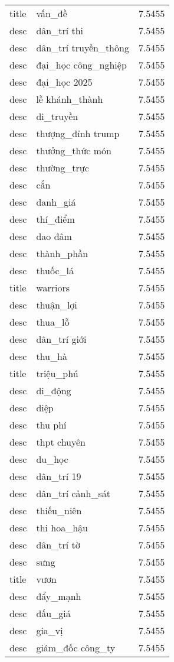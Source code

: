 \documentclass{article}
\begin{document}
\begin{tabular}{lll}
title & vấn\_đề & 7.5455\\
desc & dân\_trí thi & 7.5455\\
desc & dân\_trí truyền\_thông & 7.5455\\
desc & đại\_học công\_nghiệp & 7.5455\\
desc & đại\_học 2025 & 7.5455\\
desc & lễ khánh\_thành & 7.5455\\
desc & di\_truyền & 7.5455\\
desc & thượng\_đỉnh trump & 7.5455\\
desc & thưởng\_thức món & 7.5455\\
desc & thường\_trực & 7.5455\\
desc & cắn & 7.5455\\
desc & danh\_giá & 7.5455\\
desc & thí\_điểm & 7.5455\\
desc & dao đâm & 7.5455\\
desc & thành\_phần & 7.5455\\
desc & thuốc\_lá & 7.5455\\
title & warriors & 7.5455\\
desc & thuận\_lợi & 7.5455\\
desc & thua\_lỗ & 7.5455\\
desc & dân\_trí giới & 7.5455\\
desc & thu\_hà & 7.5455\\
title & triệu\_phú & 7.5455\\
desc & di\_động & 7.5455\\
desc & diệp & 7.5455\\
desc & thu phí & 7.5455\\
desc & thpt chuyên & 7.5455\\
desc & du\_học & 7.5455\\
desc & dân\_trí 19 & 7.5455\\
desc & dân\_trí cảnh\_sát & 7.5455\\
desc & thiếu\_niên & 7.5455\\
desc & thi hoa\_hậu & 7.5455\\
desc & dân\_trí tờ & 7.5455\\
desc & sưng & 7.5455\\
title & vươn & 7.5455\\
desc & đẩy\_mạnh & 7.5455\\
desc & đấu\_giá & 7.5455\\
desc & gia\_vị & 7.5455\\
desc & giám\_đốc công\_ty & 7.5455\\

\end{tabular}
\end{document}
